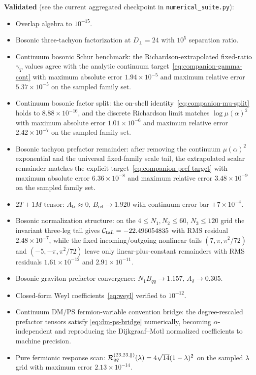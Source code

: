 \documentclass[11pt]{article}
\newcommand{\perpD}{D_\perp}
\begin{document}
\textbf{Validated} (see the current aggregated checkpoint in \texttt{numerical\_suite.py}):
\begin{itemize}
\item Overlap algebra to $10^{-15}$.
\item Bosonic three-tachyon factorization at $\perpD = 24$ with $10^5$ separation ratio.
\item Continuum bosonic Schur benchmark: the Richardson-extrapolated fixed-ratio $\gamma_T$ values agree with the analytic continuum target~\eqref{eq:companion-gamma-cont} with maximum absolute error $1.94\times 10^{-5}$ and maximum relative error $5.37\times 10^{-5}$ on the sampled family set.
\item Continuum bosonic factor split: the on-shell identity~\eqref{eq:companion-mu-split} holds to $8.88\times 10^{-16}$, and the discrete Richardson limit matches $\log\mu(\alpha)^2$ with maximum absolute error $1.01\times 10^{-6}$ and maximum relative error $2.42\times 10^{-7}$ on the sampled family set.
\item Bosonic tachyon prefactor remainder: after removing the continuum $\mu(\alpha)^2$ exponential and the universal fixed-family scale tail, the extrapolated scalar remainder matches the explicit target~\eqref{eq:companion-pref-target} with maximum absolute error $6.36\times 10^{-8}$ and maximum relative error $3.48\times 10^{-9}$ on the sampled family set.
\item $2T+1M$ tensor: $A_{\mathrm{tr}} \approx 0$, $B_{\mathrm{rel}} \to 1.920$ with continuum error bar $\pm 7 \times 10^{-4}$.
\item Bosonic normalization structure: on the $4\le N_1,N_2\le 60$, $N_3\le 120$ grid the invariant three-leg tail gives ${\cal C}_{\mathrm{tail}}=-22.496054835$ with RMS residual $2.48\times 10^{-7}$, while the fixed incoming/outgoing nonlinear tails $(7,\pi,\pi^2/72)$ and $(-5,-\pi,\pi^2/72)$ leave only linear-plus-constant remainders with RMS residuals $1.61\times 10^{-12}$ and $2.91\times 10^{-11}$.
\item Bosonic graviton prefactor convergence: $N_1 B_{qq} \to 1.157$, $A_\delta \to 0.305$.
\item Closed-form Weyl coefficients~\eqref{eq:weyl} verified to $10^{-12}$.
\item Continuum DM/PS fermion-variable convention bridge: the degree-rescaled prefactor tensors satisfy \eqref{eq:dm-ps-bridge} numerically, becoming $\alpha$-independent and reproducing the Dijkgraaf--Motl normalized coefficients to machine precision.
\item Pure fermionic response scan: ${\cal R}^{(23,23,\parallel)}_{qq}(\lambda)=4\sqrt{14}(1-\lambda)^2$ on the sampled $\lambda$ grid with maximum error $2.13\times 10^{-14}$.

\end{itemize}
\end{document}
